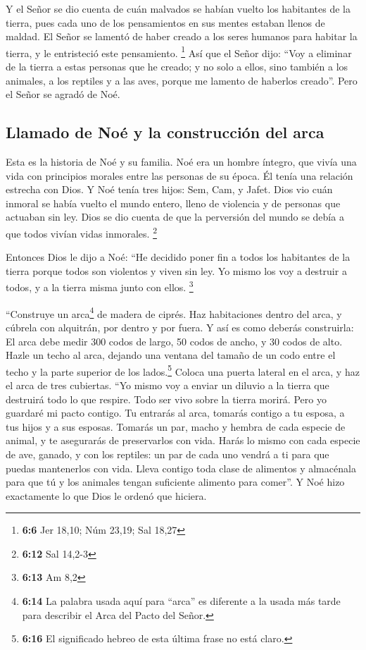  Y el Señor se dio cuenta de cuán malvados se habían
vuelto los habitantes de la tierra, pues cada uno de los pensamientos en
sus mentes estaban llenos de maldad.  El Señor se lamentó
de haber creado a los seres humanos para habitar la tierra, y le
entristeció este pensamiento. \footnote{\textbf{6:6} Jer 18,10; Núm
  23,19; Sal 18,27}  Así que el Señor dijo: ``Voy a
eliminar de la tierra a estas personas que he creado; y no solo a ellos,
sino también a los animales, a los reptiles y a las aves, porque me
lamento de haberlos creado''.  Pero el Señor se agradó de
Noé.

\hypertarget{llamado-de-nouxe9-y-la-construcciuxf3n-del-arca}{%
\subsection{Llamado de Noé y la construcción del
arca}\label{llamado-de-nouxe9-y-la-construcciuxf3n-del-arca}}

 Esta es la historia de Noé y su familia. Noé era un
hombre íntegro, que vivía una vida con principios morales entre las
personas de su época. Él tenía una relación estrecha con Dios.
 Y Noé tenía tres hijos: Sem, Cam, y Jafet.
 Dios vio cuán inmoral se había vuelto el mundo entero,
lleno de violencia y de personas que actuaban sin ley. 
Dios se dio cuenta de que la perversión del mundo se debía a que todos
vivían vidas inmorales. \footnote{\textbf{6:12} Sal 14,2-3}

 Entonces Dios le dijo a Noé: ``He decidido poner fin a
todos los habitantes de la tierra porque todos son violentos y viven sin
ley. Yo mismo los voy a destruir a todos, y a la tierra misma junto con
ellos. \footnote{\textbf{6:13} Am 8,2}

 ``Construye un arca\footnote{\textbf{6:14} La palabra
  usada aquí para ``arca'' es diferente a la usada más tarde para
  describir el Arca del Pacto del Señor.} de madera de ciprés. Haz
habitaciones dentro del arca, y cúbrela con alquitrán, por dentro y por
fuera.  Y así es como deberás construirla: El arca debe
medir 300 codos de largo, 50 codos de ancho, y 30 codos de alto.
 Hazle un techo al arca, dejando una ventana del tamaño
de un codo entre el techo y la parte superior de los lados.\footnote{\textbf{6:16}
  El significado hebreo de esta última frase no está claro.} Coloca una
puerta lateral en el arca, y haz el arca de tres cubiertas.
 ``Yo mismo voy a enviar un diluvio a la tierra que
destruirá todo lo que respire. Todo ser vivo sobre la tierra morirá.
 Pero yo guardaré mi pacto contigo. Tu entrarás al arca,
tomarás contigo a tu esposa, a tus hijos y a sus esposas.
 Tomarás un par, macho y hembra de cada especie de
animal, y te asegurarás de preservarlos con vida.  Harás
lo mismo con cada especie de ave, ganado, y con los reptiles: un par de
cada uno vendrá a ti para que puedas mantenerlos con vida.
 Lleva contigo toda clase de alimentos y almacénala para
que tú y los animales tengan suficiente alimento para comer''.
 Y Noé hizo exactamente lo que Dios le ordenó que
hiciera.

